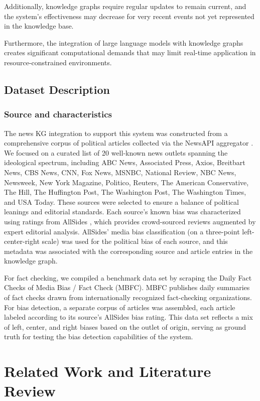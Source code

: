 \documentclass{scrartcl}
\begin{document}
Additionally, knowledge graphs require regular updates to remain current, and the system's effectiveness may decrease for very recent events not yet represented in the knowledge base.

Furthermore, the integration of large language models with knowledge graphs creates significant computational demands that may limit real-time application in resource-constrained environments.

\subsection{Dataset Description}
\subsubsection{Source and characteristics}
The news KG integration to support this system was constructed from a comprehensive corpus of political articles collected via the NewsAPI aggregator \cite{r15}. We focused on a curated list of 20 well-known news outlets spanning the ideological spectrum, including ABC News, Associated Press, Axios, Breitbart News, CBS News, CNN, Fox News, MSNBC, National Review, NBC News, Newsweek, New York Magazine, Politico, Reuters, The American Conservative, The Hill, The Huffington Post, The Washington Post, The Washington Times, and USA Today. These sources were selected to ensure a balance of political leanings and editorial standards. Each source’s known bias was characterized using ratings from AllSides \cite{r16}, which provides crowd-sourced reviews augmented by expert editorial analysis. AllSides’ media bias classification (on a three-point left-center-right scale) was used for the political bias of each source, and this metadata was associated with the corresponding source and article entries in the knowledge graph.

For fact checking, we compiled a benchmark data set by scraping the Daily Fact Checks of Media Bias / Fact Check (MBFC)\cite{r17}. MBFC publishes daily summaries of fact checks drawn from internationally recognized fact-checking organizations. For bias detection, a separate corpus of articles was assembled, each article labeled according to its source’s AllSides bias rating. This data set reflects a mix of left, center, and right biases based on the outlet of origin, serving as ground truth for testing the bias detection capabilities of the system. 



\section{Related Work and Literature Review}
\end{document}
